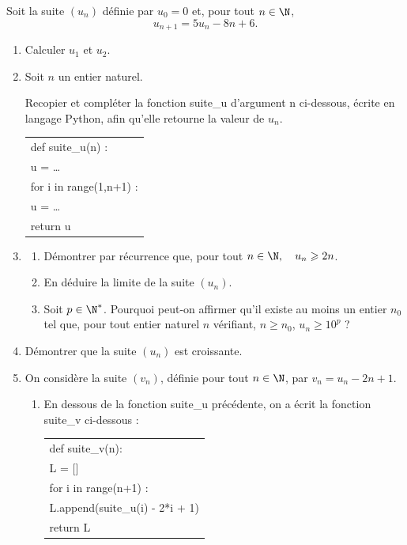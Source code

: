 \medskip

Soit la suite $\left(u_n\right)$ définie par $u_0 = 0$ et, pour tout $n \in \N$, 
\[u_{n+1} = 5u_n - 8n + 6.\]

\smallskip

\begin{enumerate}
\item Calculer $u_1$ et $u_2$.
\item Soit $n$ un entier naturel.

Recopier et compléter la fonction {\ttfamily suite\_u} d'argument {\ttfamily n}  ci-dessous, écrite en langage Python, afin qu'elle retourne la valeur de $u_n$.

\begin{center}
\begin{tabular}{>{\ttfamily}l}
def suite\_u(n) : \\
\qquad u = \ldots\\
\qquad for i in range(1,n+1) :\\
\qquad \vline \qquad u = \ldots\\
\qquad return u
\end{tabular}
\end{center}
\item
	\begin{enumerate}
		\item Démontrer par récurrence que, pour tout $n \in \N ,\quad  u_n \geqslant 2n$.
		\item En déduire la limite de la suite $\left(u_n\right)$.
		\item Soit $p \in \N^*$. Pourquoi peut-on affirmer qu'il existe au moins un entier $n_0$ tel que,  pour tout entier naturel $n$ vérifiant, $n \geqslant n_0$,\: $u_n \geqslant  10^p$ ?
\end{enumerate}
\item Démontrer que la suite $\left(u_n\right)$ est croissante.
\item On considère la suite $\left(v_n\right)$, définie pour tout $n \in  \N$, par $v_n = u_n - 2n + 1$.
	\begin{enumerate}
		\item En dessous de la fonction {\ttfamily suite\_u} précédente, on a écrit la fonction {\ttfamily suite\_v} ci-dessous :
\begin{center}
\begin{tabular}{>{\ttfamily}l}
def suite\_v(n):\\
\qquad L = []\\
\qquad  for i in range(n+1) :\\
\qquad \vline \qquad L.append(suite\_u(i) - 2*i + 1)\\
\qquad return L
\end{tabular}
\end{center}


\end{enumerate}
\end{enumerate}
